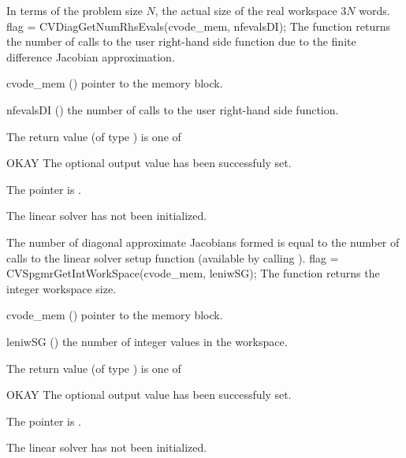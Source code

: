 {
  In terms of the problem size $N$, the actual size of the real workspace
  $3 N$  words.
}
{
  flag = CVDiagGetNumRhsEvals(cvode\_mem, nfevalsDI);
}
{
  The function  returns the
  number of calls to the user right-hand side function due to the 
  finite difference Jacobian approximation.
}
{
  \begin{args}
  \item[cvode\_mem] ()
    pointer to the {\cvode} memory block.
  \item[nfevalsDI] ()
    the number of calls to the user right-hand side function.
  \end{args}
}
{
  The return value  (of type ) is one of
  \begin{args}
  \item[OKAY] 
    The optional output value has been successfuly set.
  \item[\Id{LIN\_NO\_MEM}]
    The  pointer is .
  \item[\Id{LIN\_NO\_LMEM}]
    The {\cvdiag} linear solver has not been initialized.
  \end{args}
}
{
  The number of diagonal approximate Jacobians formed is
  equal to the number of calls to the linear solver setup function
  (available by calling ).
}
%
%
{
  flag = CVSpgmrGetIntWorkSpace(cvode\_mem, leniwSG);
}
{
  The function  returns the
  {\cvspgmr} integer workspace size.
}
{
  \begin{args}
  \item[cvode\_mem] ()
    pointer to the {\cvode} memory block.
  \item[leniwSG] ()
    the number of integer values in the {\cvspgmr} workspace.
  \end{args}
}
{
  The return value  (of type ) is one of
  \begin{args}
  \item[OKAY] 
    The optional output value has been successfuly set.
  \item[\Id{LIN\_NO\_MEM}]
    The  pointer is .
  \item[\Id{LIN\_NO\_LMEM}]
    The {\cvspgmr} linear solver has not been initialized.
  \end{args}
}
